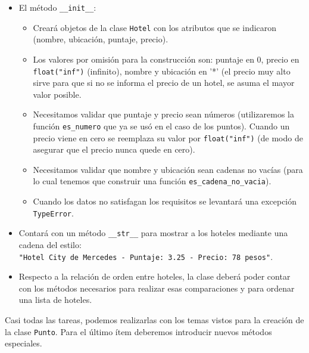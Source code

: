 \begin{itemize}
\item El método \lstinline+__init__+:

\begin{itemize}
\item Creará objetos de la clase \lstinline!Hotel! con los atributos que se
indicaron (nombre, ubicación, puntaje, precio).

\item Los valores por omisión para la construcción son: puntaje en 0,
precio en \lstinline!float("inf")! (infinito), nombre y ubicación en '*'
(el precio muy alto sirve para que si no se informa el precio de un hotel,
se asuma el mayor valor posible.

\item Necesitamos validar que puntaje y precio sean números (utilizaremos
la función \lstinline!es_numero! que ya se usó en el caso de los puntos).
Cuando un precio viene en cero se reemplaza su valor por
\lstinline!float("inf")!  (de modo de asegurar que el precio nunca quede en
cero).

\item Necesitamos validar que nombre y ubicación sean cadenas no vacías
(para lo cual tenemos que construir una función
\lstinline!es_cadena_no_vacia!).

\item Cuando los datos no satisfagan los requisitos se levantará una
excepción \lstinline!TypeError!.
\end{itemize}

\item Contará con un método \lstinline+__str__+ para mostrar a los hoteles
mediante una cadena del estilo: \\
\lstinline+"Hotel City de Mercedes - Puntaje: 3.25 - Precio: 78 pesos"+.

\item Respecto a la relación de orden entre hoteles, la clase deberá poder
contar con los métodos necesarios para realizar esas comparaciones y para
ordenar una lista de hoteles.
\end{itemize}

Casi todas las tareas, podemos realizarlas con los temas vistos para la
creación de la clase \lstinline!Punto!.  Para el último ítem deberemos
introducir nuevos métodos especiales.

 \\

